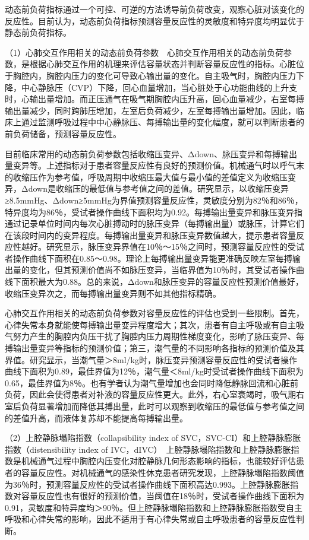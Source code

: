 动态前负荷指标通过一个可控、可逆的方法诱导前负荷改变，观察心脏对该变化的反应性。目前认为，动态前负荷指标预测容量反应性的灵敏度和特异度均明显优于静态前负荷指标。

（1）心肺交互作用相关的动态前负荷参数　心肺交互作用相关的动态前负荷参数，是根据心肺交互作用的机理来评估容量状态并判断容量反应性的指标。心脏位于胸腔内，胸腔内压力的变化可导致心输出量的变化。自主吸气时，胸腔内压力下降，中心静脉压（CVP）下降，回心血量增加，当心脏处于心功能曲线的上升支时，心输出量增加。而正压通气在吸气期胸腔内压升高，回心血量减少，右室每搏输出量减少，同时跨肺压增加，左室后负荷减少，左室每搏输出量增加。因此，临床上通过监测呼吸过程中中心静脉压、每搏输出量的变化幅度，就可以判断患者的前负荷储备，预测容量反应性。

目前临床常用的动态前负荷参数包括收缩压变异、Δdown、脉压变异和每搏输出量变异等。上述指标对于患者容量反应性有良好的预测价值。机械通气时以呼气末的收缩压作为参考值，呼吸周期中收缩压最大值与最小值的差值定义为收缩压变异，Δdown是收缩压的最低值与参考值之间的差值。研究显示，以收缩压变异≥8.5mmHg、Δdown≥5mmHg为界值预测容量反应性，灵敏度分别为82％和86％，特异度均为86％，受试者操作曲线下面积均为0.92。每搏输出量变异和脉压变异指通过记录单位时间内每次心脏搏动时的脉压变异（每搏输出量）或脉压，计算它们在该段时间内的变异程度。每搏输出量变异和脉压变异数值越大，提示患者容量反应性越好。研究显示，脉压变异界值在10％～15％之间时，预测容量反应性的受试者操作曲线下面积在0.85～0.98。理论上每搏输出量变异能更准确反映左室每搏输出量的变化，但其预测价值尚不如脉压变异，当临界值为10％时，其受试者操作曲线下面积最大为0.88。总的来说，Δdown和脉压变异的容量反应性预测价值最好，收缩压变异次之，而每搏输出量变异则不如其他指标精确。

心肺交互作用相关的动态前负荷参数对容量反应性的评估也受到一些限制。首先，心律失常本身就能使每搏输出量变异程度增大；其次，患者有自主呼吸或有自主吸气努力产生的胸腔内负压干扰了胸腔内压力周期性梯度变化，影响了脉压变异、每搏输出量变异等指标的预测价值；第三，潮气量的不同影响各指标的预测价值及其界值。研究显示，当潮气量＞8ml/kg时，脉压变异预测容量反应性的受试者操作曲线下面积为0.89，最佳界值为12％，潮气量＜8ml/kg时受试者操作曲线下面积为0.65，最佳界值为8％。也有学者认为潮气量增加也会同时降低静脉回流和心脏前负荷，因此会使得患者对补液的容量反应性更大。此外，右心室衰竭时，吸气期右室后负荷显著增加而降低其搏出量，此时可以观察到收缩压的最低值与参考值之间的差值升高，而液体复苏却不能提高每搏输出量。

（2）上腔静脉塌陷指数（collapsibility index of
SVC，SVC-CI）和上腔静脉膨胀指数（distensibility index of
IVC，dIVC）　上腔静脉塌陷指数和上腔静脉膨胀指数是机械通气过程中胸腔内压变化对腔静脉几何形态影响的指标，也能较好评估患者的容量反应性。对机械通气的感染性休克患者研究发现，上腔静脉塌陷指数阈值为36％时，预测容量反应性的受试者操作曲线下面积高达0.993。上腔静脉膨胀指数对容量反应性也有很好的预测价值，当阈值在18％时，受试者操作曲线下面积为0.91，灵敏度和特异度均＞90％。但上腔静脉塌陷指数和上腔静脉膨胀指数受自主呼吸和心律失常的影响，因此不适用于有心律失常或自主呼吸患者的容量反应性判断。

